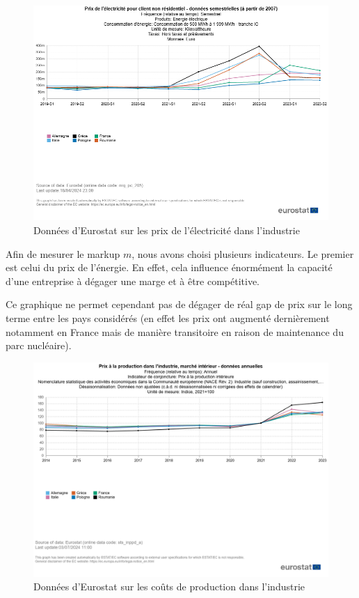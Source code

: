 \documentclass{article}
\begin{document}
\begin{figure}[H]
  \centering
  \begin{minipage}{0.8\textwidth}
      \centering
      \includegraphics[width=\textwidth]{"prix_elec.png"}
      \caption{Données d'Eurostat sur les prix de l'électricité dans l'industrie}
  \end{minipage}
\end{figure}
\vspace{0.5cm}

Afin de mesurer le markup $m$, nous avons choisi plusieurs indicateurs. Le premier est celui du prix de l'énergie. En effet, cela influence énormément la capacité d'une entreprise à dégager une marge et à être compétitive.

Ce graphique ne permet cependant pas de dégager de réal gap de prix sur le long terme entre les pays considérés (en effet les prix ont augmenté dernièrement notamment en France mais de manière transitoire en raison de maintenance du parc nucléaire).

\begin{figure}[H]
  \centering
  \begin{minipage}{0.8\textwidth}
      \centering
      \includegraphics[width=\textwidth]{"prix_prod.png"}
      \caption{Données d'Eurostat sur les coûts de production dans l'industrie}
  \end{minipage}
\end{figure}
\vspace{0.5cm}
\end{document}
